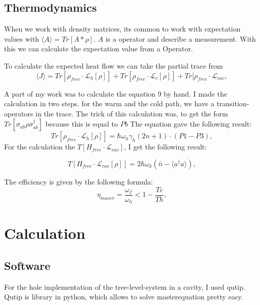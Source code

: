 \documentclass[12pt,a4paper]{article}
\begin{document}
\subsection{Thermodynamics}
 When we work with density matrices, its common to work with expectation values with $\langle A \rangle=Tr[A*\rho]$.
 $A$ is a operator and describe a measurement.
With this we can calculate the expectation value from a Operator. 

To calculate the expected heat flow we can take the partial trace from 
\begin{equation}
\langle J\rangle=Tr[\rho_{free}\cdot \mathcal{L}_h[\rho]]+Tr[\rho_{free}\cdot \mathcal{L}_c[\rho]]+Tr[\rho_{free}\cdot \mathcal{L}_{cav},
\end{equation}

A part of my work was to calculate the equation 9 by hand. 
I made the calculation in two steps. for the warm and the cold path, we have a transition-operators in the trace.
The trick of this calculation was, to get the form $Tr[\sigma_{ab}\rho \sigma_{ab}^{\dag{}}]$ because this is equal to $Pb$
The equation gave the following result:
\begin{equation}
Tr[\rho_{free}\cdot \mathcal{L}_h[\rho]]=\hbar \omega_h \gamma_h (2n+1) \cdot( P1-P3) ,
\end{equation}
For the calculation the $T[H_{free}\cdot \mathcal{L}_{cav}]$, I get the following result:

\begin{equation}
T[H_{free}\cdot \mathcal{L}_{cav}[\rho]]=2\hbar \omega_k (\bar{n}-\langle a^{\dag{}}a \rangle),
\end{equation}

The efficiency is given by the following formula:
\begin{equation}
\eta_{maser}=\frac{\omega_f}{\omega_h}<1-\frac{Tc}{Th},
\end{equation}



\section{Calculation}
\subsection{Software}
For the hole implementation of the tree-level-system in a cavity, I used qutip. Qutip is library in python, which allows to solve masterequation pretty easy.
\end{document}

